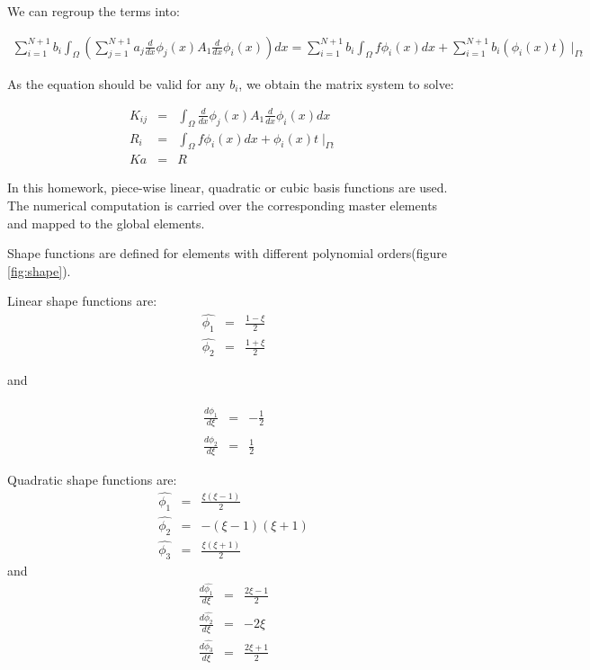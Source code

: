 \documentclass[paper=a4, fontsize=11pt]{article} %
\begin{document}
We can regroup the terms into:

\begin{eqnarray}
\sum_{i=1}^{N+1} b_i \int_{\Omega} (\sum_{j=1}^{N+1} a_j \frac{d}{dx} \phi_j(x) A_1 \frac{d}{dx} \phi_i(x)) dx = \sum_{i=1}^{N+1} b_i \int_{\Omega} f \phi_i(x) dx + \sum_{i=1}^{N+1} b_i (\phi_i(x) t) \mid _{\Gamma t}
\end{eqnarray}

As the equation should be valid for any $b_i$, we obtain the matrix system to solve:
 
\begin{eqnarray}
K_{ij} &=& \int_{\Omega} \frac{d}{dx} \phi_j(x) A_1 \frac{d}{dx} \phi_i(x) dx \nonumber\\
R_i &=& \int_{\Omega} f \phi_i(x) dx + \phi_i(x) t \mid _{\Gamma t}\nonumber\\
K a &=& R
\end{eqnarray}


In this homework, piece-wise linear, quadratic or cubic basis functions are used. The numerical computation is carried over the corresponding master elements and mapped to the global elements. 

Shape functions are defined for elements with different polynomial orders(figure \ref{fig:shape}).

Linear shape functions are:
\begin{eqnarray}
\hat{\phi_1} &=& \frac{1-\xi}{2}\nonumber\\
\hat{\phi_2} &=& \frac{1+\xi}{2}
\end{eqnarray}

and

\begin{eqnarray}
\frac{d\hat{\phi_1}}{d\xi} &=& -\frac{1}{2}\nonumber\\
\frac{d\hat{\phi_2}}{d\xi} &=& \frac{1}{2}
\end{eqnarray}

Quadratic shape functions are:
\begin{eqnarray}
\hat{\phi_1} &=& \frac{\xi(\xi-1)}{2} \nonumber\\
\hat{\phi_2} &=& -(\xi-1)(\xi+1)\nonumber\\
\hat{\phi_3} &=& \frac{\xi(\xi+1)} {2}
\end{eqnarray}
and 
\begin{eqnarray}
\frac{d\hat{\phi_1}}{d\xi} &=& \frac{2\xi-1}{2} \nonumber\\
\frac{d\hat{\phi_2}}{d\xi} &=& -2\xi \nonumber\\
\frac{d\hat{\phi_3}}{d\xi} &=& \frac{2\xi+1}{2}
\end{eqnarray}
\end{document}
